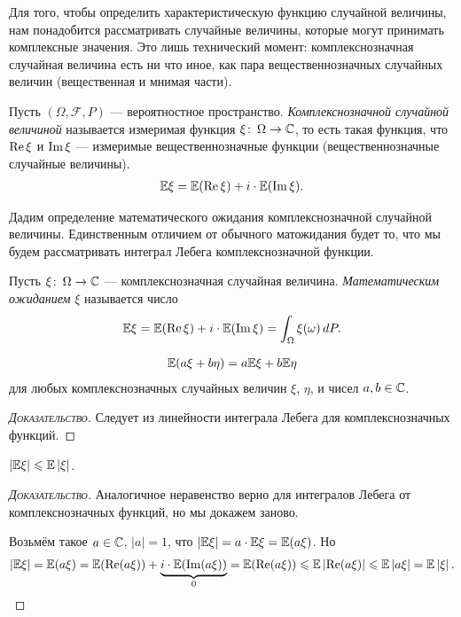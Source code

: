 \documentclass[../main.tex]{subfiles}
\begin{document}
Для того, чтобы определить характеристическую функцию случайной величины, нам понадобится рассматривать случайные величины, которые могут принимать комплексные значения. Это лишь технический момент: комплекснозначная случайная величина есть ни что иное, как пара вещественнозначных случайных величин (вещественная и мнимая части).

\begin{df}
 Пусть $ (\Omega, \mathcal F, P) $ --- вероятностное пространство.
 \textit{Комплекснозначной случайной величиной} называется измеримая функция $ \xi \colon\, \Omega \to \mathbb{C} $, то есть такая функция, что $ \operatorname{Re} \xi $ и $ \operatorname{Im} \xi $ --- измеримые вещественнозначные функции (вещественнозначные случайные величины).
 \begin{align*}
  \mathbb E \xi = \mathbb E (\operatorname{Re} \xi) + i \cdot \mathbb E (\operatorname{Im} \xi).
 \end{align*}
\end{df}

Дадим определение математического ожидания комплекснозначной случайной величины. Единственным отличием от обычного матожидания будет то, что мы будем рассматривать интеграл Лебега комплекснозначной функции.

\begin{df}
 \label{def:complex_ev}
 Пусть $ \xi\colon\,\Omega\to\mathbb{C} $ --- комплекснозначная случайная величина. \textit{Математическим ожиданием} $ \xi $ называется число
 \begin{align*}
  \mathbb E\xi = \mathbb E(\operatorname{Re} \xi) + i \cdot \mathbb E(\operatorname{Im} \xi) = \int_{\Omega} \xi(\omega)\,dP.
 \end{align*}
\end{df}
\begin{prop}
 \begin{align*}
  \mathbb E(a\xi + b\eta) = a \mathbb E \xi + b \mathbb E \eta
 \end{align*} для любых комплекснозначных случайных величин $ \xi $, $ \eta $, и чисел $ a,b\in\mathbb{C} $.
\end{prop}
\begin{proof}[\normalfont\textsc{Доказательство}]
 Следует из линейности интеграла Лебега для комплекснозначных функций.
\end{proof}
\begin{prop}
 $ \left| \mathbb E \xi \right| \leqslant \mathbb E \left| \xi \right| $.
\end{prop}
\begin{proof}[\normalfont\textsc{Доказательство}]
 Аналогичное неравенство верно для интегралов Лебега от комплекснозначных функций, но мы докажем заново.

 Возьмём такое $ a \in \mathbb{C} $, $ \left| a \right| = 1 $, что $ \left| \mathbb E \xi \right| = a \cdot \mathbb E \xi = \mathbb E(a\xi) $. Но
 \begin{align*}
  \left| \mathbb E\xi \right| = \mathbb E(a\xi) = \mathbb E(\operatorname{Re}(a\xi)) + \underbrace{i \cdot \mathbb E(\operatorname{Im}(a\xi))}_{0} = \mathbb E(\operatorname{Re}(a\xi)) \leqslant \mathbb E \left| \operatorname{Re}(a\xi) \right| \leqslant \mathbb E \left| a\xi \right| = \mathbb E \left| \xi \right|.
 \end{align*}
\end{proof}
\end{document}
